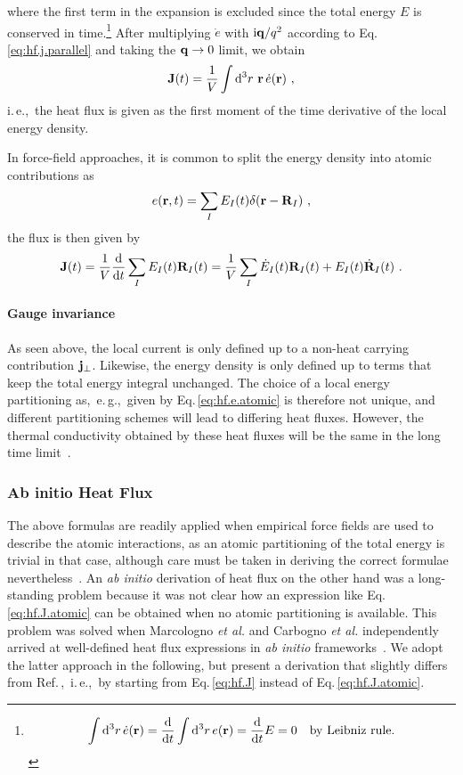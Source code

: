 where the first term in the expansion is excluded since the total energy $E$ is conserved in time.\footnote{
\begin{align}
	\int {\rm d}^3 r \, \dot{e} ({\bf r}) = \frac{{\rm d}}{{\rm d} t} \int {\rm d}^3 r \, e ({\bf r}) = \frac{{\rm d}}{{\rm d} t} E = 0
	\quad\text{by Leibniz rule.}
\end{align}
}
After multiplying $\dot e$ with ${\rm i} {\bf q} / q^2$ according to Eq.\,\eqref{eq:hf.j.parallel} and taking the ${\bf q} \to 0$ limit, we obtain
\begin{align}
	{\bf J} (t) = \frac{1}{V} \int {\rm d}^3 r ~ {\bf r} \, \dot{e} ({\bf r})~,
	\label{eq:hf.J}
\end{align}
i.\,e.,~the heat flux is given as the first moment of the time derivative of the local energy density. 

In force-field approaches, it is common to split the energy density into atomic contributions as
\begin{align}
	e ({\bf r}, t ) = \sum_I E_I (t) \delta ({\bf r} - {\bf R}_I)~,
	\label{eq:hf.e.atomic}
\end{align}
the flux is then given by
\begin{align}
	{\bf J} (t) 
		= \frac{1}{V} \frac{{\rm d}}{{\rm d} t} \sum_I E_I(t) {\bf R}_I(t)
		= \frac{1}{V} \sum_I \dot{E}_I (t) {\bf R}_I (t) + E_I (t) \dot{{\bf R}}_I (t)~.
	\label{eq:hf.J.atomic}
\end{align}

\paragraph{Gauge invariance}
As seen above, the local current is only defined up to a non-heat carrying contribution ${\bf j}_{\perp}$. Likewise, the energy density is only defined up to terms that keep the total energy integral unchanged. The choice of a local energy partitioning as,~e.\,g.,~given by Eq.\,\eqref{eq:hf.e.atomic} is therefore not unique, and different partitioning schemes will lead to differing heat fluxes. However, the thermal conductivity obtained by these heat fluxes will be the same in the long time limit~\cite{Ercole2016}.

\subsubsection{Ab initio Heat Flux}
The above formulas are readily applied when empirical force fields are used to describe the atomic interactions, as an atomic partitioning of the total energy is trivial in that case, although care must be taken in deriving the correct formulae nevertheless~\cite{Fan2015,Boone2019}. An \emph{ab initio} derivation of heat flux on the other hand was a long-standing problem because it was not clear how an expression like Eq.\,\eqref{eq:hf.J.atomic} can be obtained when no atomic partitioning is available. This problem was solved when Marcologno \emph{et al.} and Carbogno \emph{et al.} independently arrived at well-defined heat flux expressions in \emph{ab initio} frameworks~\cite{Marcolongo2016,Carbogno2016}. We adopt the latter approach in the following, but present a derivation that slightly differs from Ref.\,\cite{Carbogno2016},~i.\,e.,~by starting from Eq.\,\eqref{eq:hf.J} instead of Eq.\,\eqref{eq:hf.J.atomic}.

